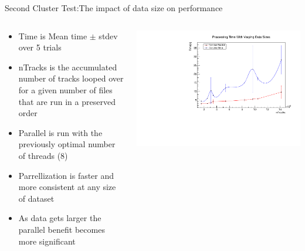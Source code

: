 \documentclass[10pt]{beamer}
\begin{document}
\begin{frame}
Second Cluster Test:The impact of data size on performance\\
\begin{columns}
	\begin{column}{0.5\textwidth}
		\scriptsize
	\begin{itemize}
		\item Time is Mean time $\pm$ stdev over 5 trials
		\item nTracks is the accumulated number of tracks looped over for a given number of files that are run in a preserved order
		\item Parallel is run with the previously optimal number of threads (8)
		\item Parrellization is faster and more consistent at any size of dataset 
		\item As data gets larger the parallel benefit becomes more significant
	\end{itemize}
	\end{column}
	\begin{column}{0.5\textwidth}
   		\includegraphics[scale=0.3, left]{../ParTree_t3/sizetestt3.pdf}
	\end{column}
\end{columns}

\end{frame}
\end{document}
